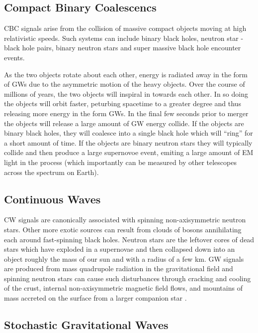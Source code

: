 \subsection{Compact Binary Coalescencs}

\ac{CBC} signals arise from the collision of massive compact 
objects moving at high relativistic speeds. Such systems can 
include binary black holes, neutron star - black hole pairs, binary 
neutron stars and super massive black hole encounter events. 

As the two objects rotate about each other, energy is radiated away in the 
form of \ac{GW}s due to the asymmetric motion of the heavy objects. 
Over the course of millions of years, the two objects will 
inspiral in towards each other. In so doing the objects will 
orbit faster, peturbing spacetime to a greater degree and 
thus releasing more energy in the form \ac{GW}s. In the final few 
seconds prior to merger the objects will release a large amount of 
\ac{GW} energy collide. If the objects are binary black holes, they 
will coalesce into a single black hole which will ``ring'' for a 
short amount of time. If the objects are binary neutron stars they will 
typically collide and then produce a large supernovoe event, emiting 
a large amount of \ac{EM} light in the process (which importantly 
can be measured by other telescopes across the spectrum on Earth). 

\subsection{Continuous Waves}

\ac{CW} signals are canonically associated with spinning non-axisymmetric 
neutron stars. Other more exotic sources can result from clouds of bosons 
annihilating each around fast-spinning black holes. 
Neutron stars are the leftover cores of dead stars 
which have exploded in a supernovae and then collapsed down 
into an object roughly the mass of our sun and with a radius of a 
few km. \ac{GW} signals are produced from mass quadrupole radiation in the 
gravitational field and spinning neutron stars can cause such 
disturbances through cracking and cooling of the crust, internal non-axisymmetric 
magnetic field flows, and mountains of mass accreted on the 
surface from a larger companion star \cite{1712.05897}.

\subsection{Stochastic Gravitational Waves}
%

